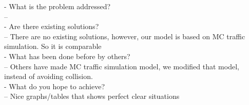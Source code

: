 - What is the problem addressed? \\
-- \\
- Are there existing solutions? \\
-- There are no existing solutions, however, our model is based on MC traffic simulation. So it is comparable \\
- What has been done before by others? \\ 
-- Others have made MC traffic simulation model, we modified that model, instead of avoiding collision. \\
- What do you hope to achieve? \\
-- Nice graphs/tables that shows perfect clear situations